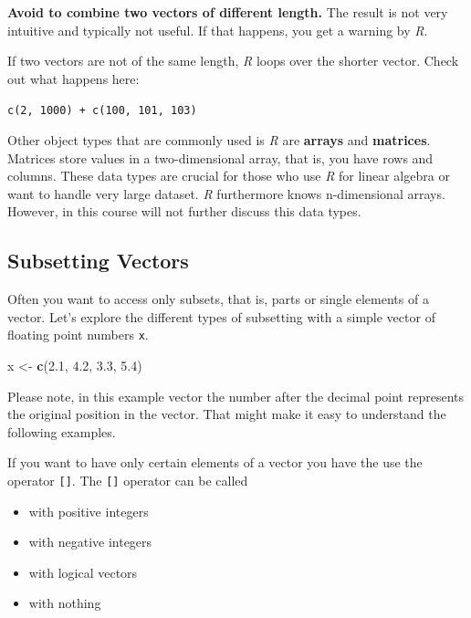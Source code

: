 \documentclass[
]{scrartcl}
\makeatletter
\newenvironment{Shaded}{\begin{snugshade}}{\end{snugshade}}
\newcommand{\FloatTok}[1]{\textcolor[rgb]{0.00,0.00,0.81}{#1}}
\newcommand{\FunctionTok}[1]{\textcolor[rgb]{0.13,0.29,0.53}{\textbf{#1}}}
\newcommand{\NormalTok}[1]{#1}
\newcommand{\OtherTok}[1]{\textcolor[rgb]{0.56,0.35,0.01}{#1}}
\providecommand{\tightlist}{%
  \setlength{\itemsep}{0pt}\setlength{\parskip}{0pt}}
\newenvironment{kframe}{%
\medskip{}
\setlength{\fboxsep}{.8em}
 \def\at@end@of@kframe{}%
 \ifinner\ifhmode%
  \def\at@end@of@kframe{\end{minipage}}%
  \begin{minipage}{\columnwidth}%
 \fi\fi%
 \def\FrameCommand##1{\hskip\@totalleftmargin \hskip-\fboxsep
 \colorbox{shadecolor}{##1}\hskip-\fboxsep
     \hskip-\linewidth \hskip-\@totalleftmargin \hskip\columnwidth}%
 \MakeFramed {\advance\hsize-\width
   \@totalleftmargin\z@ \linewidth\hsize
   \@setminipage}}%
 {\par\unskip\endMakeFramed%
 \at@end@of@kframe}
\newenvironment{rmdblock}[1]
  {
  \begin{itemize}
  \renewcommand{\labelitemi}{
    \raisebox{-.7\height}[0pt][0pt]{
      {\setkeys{Gin}{width=3em,keepaspectratio}\texttt{[image: images/\#1]}}
    }
  }
  \setlength{\fboxsep}{1em}
  \begin{kframe}
  \item
  }
  {
  \end{kframe}
  \end{itemize}
  }
\newenvironment{geek}
    {\begin{rmdblock}{geek}}
    {\end{rmdblock}}
\makeatother
\begin{document}
\textbf{Avoid to combine two vectors of different length.} The result is not very intuitive and typically not useful. If that happens, you get a warning by \emph{R}.

\begin{geek}
If two vectors are not of the same length, \emph{R} loops over the
shorter vector. Check out what happens here:

\texttt{c(2,\ 1000)\ +\ c(100,\ 101,\ 103)}
\end{geek}

Other object types that are commonly used is \emph{R} are \textbf{arrays} and \textbf{matrices}. Matrices store values in a two-dimensional array, that is, you have rows and columns. These data types are crucial for those who use \emph{R} for linear algebra or want to handle very large dataset. \emph{R} furthermore knows n-dimensional arrays. However, in this course will not further discuss this data types.

\subsection{Subsetting Vectors}\label{subsetting}

Often you want to access only subsets, that is, parts or single elements of a vector. Let's explore the different types of subsetting with a simple vector of floating point numbers \texttt{x}.

\begin{Shaded}
\begin{Highlighting}[]
\NormalTok{x }\OtherTok{\textless{}{-}} \FunctionTok{c}\NormalTok{(}\FloatTok{2.1}\NormalTok{, }\FloatTok{4.2}\NormalTok{, }\FloatTok{3.3}\NormalTok{, }\FloatTok{5.4}\NormalTok{)}
\end{Highlighting}
\end{Shaded}

Please note, in this example vector the number after the decimal point represents the original position in the vector. That might make it easy to understand the following examples.

If you want to have only certain elements of a vector you have the use the operator \texttt{{[}{]}}. The \texttt{{[}{]}} operator can be called

\begin{itemize}
\tightlist
\item
  with positive integers
\item
  with negative integers
\item
  with logical vectors
\item
  with nothing
\end{itemize}
\end{document}
